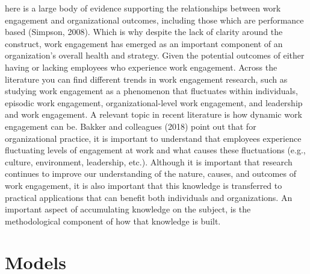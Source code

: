\documentclass[
  english,
  man]{apa7}
\begin{document}
here is a large body of evidence supporting the relationships between work engagement and organizational outcomes, including those which are performance based (Simpson, 2008). Which is why despite the lack of clarity around the construct, work engagement has emerged as an important component of an organization's overall health and strategy. Given the potential outcomes of either having or lacking employees who experience work engagement. Across the literature you can find different trends in work engagement research, such as studying work engagement as a phenomenon that fluctuates within individuals, episodic work engagement, organizational-level work engagement, and leadership and work engagement. A relevant topic in recent literature is how dynamic work engagement can be. Bakker and colleagues (2018) point out that for organizational practice, it is important to understand that employees experience fluctuating levels of engagement at work and what causes these fluctuations (e.g., culture, environment, leadership, etc.). Although it is important that research continues to improve our understanding of the nature, causes, and outcomes of work engagement, it is also important that this knowledge is transferred to practical applications that can benefit both individuals and organizations. An important aspect of accumulating knowledge on the subject, is the methodological component of how that knowledge is built.

\hypertarget{models}{%
\section{Models}\label{models}}
\end{document}
